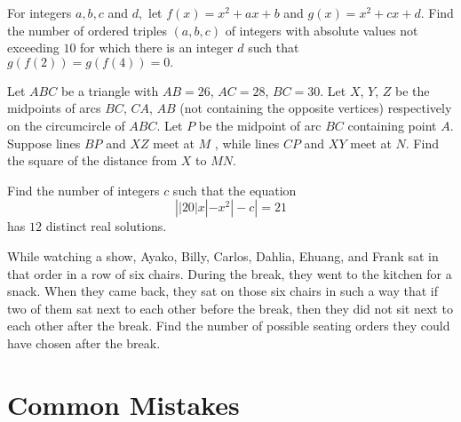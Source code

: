 \documentclass[mast]{lucky}
\begin{document}
\begin{prob}[AIME I 2020/11]{9}
For integers $a,b,c$ and $d,$ let $f(x)=x^2+ax+b$ and $g(x)=x^2+cx+d.$ Find the number of ordered triples $(a,b,c)$ of integers with absolute values not exceeding $10$ for which there is an integer $d$ such that $g(f(2))=g(f(4))=0.$
\end{prob}

\begin{prob}{9}
Let $ABC$ be a triangle with $AB=26$, $AC=28$, $BC=30$. Let $X$, $Y$, $Z$ be the midpoints of arcs $BC$, $CA$, $AB$ (not containing the opposite vertices) respectively on the circumcircle of $ABC$. Let $P$ be the midpoint of arc $BC$ containing point $A$. Suppose lines $BP$ and $XZ$ meet at $M$ , while lines $CP$ and $XY$ meet at $N$. Find the square of the distance from $X$ to $MN$.
\end{prob}

\begin{prob}[AIME I 2021/8]{13}
Find the number of integers $c$ such that the equation $$\left||20|x|-x^2|-c\right|=21$$has $12$ distinct real solutions.
\end{prob}

\begin{prob}[AIME II 2020/9]{13}
While watching a show, Ayako, Billy, Carlos, Dahlia, Ehuang, and Frank sat in that order in a row of six chairs. During the break, they went to the kitchen for a snack. When they came back, they sat on those six chairs in such a way that if two of them sat next to each other before the break, then they did not sit next to each other after the break. Find the number of possible seating orders they could have chosen after the break.
\end{prob}


\pagebreak

\section{Common Mistakes}
\end{document}
